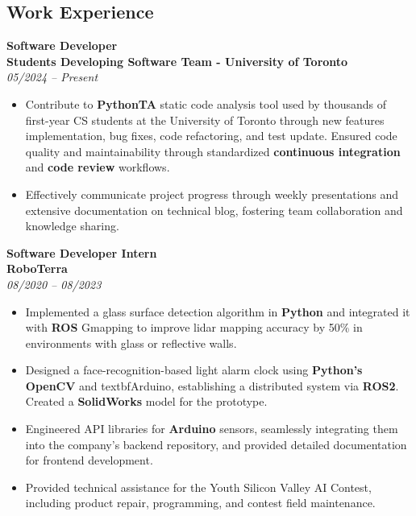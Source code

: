 \documentclass[a4paper,10pt]{article}
\begin{document}
\begin{multicols}{2}
\noindent
\section*{\color{NavyBlue}Work Experience}

\textbf{\large{Software Developer}} \\
\textbf{Students Developing Software Team - University of Toronto} \\
\textit{05/2024 -- Present} \\
\begin{itemize}
    \item Contribute to \textbf{PythonTA} static code analysis tool used by thousands of first-year CS students at the University of Toronto through new features implementation, bug fixes, code refactoring, and test update. Ensured code quality and maintainability through standardized \textbf{continuous integration} and \textbf{code review} workflows.
    \item Effectively communicate project progress through weekly presentations and extensive documentation on technical blog, fostering team collaboration and knowledge sharing.
\end{itemize}

\vspace{0.25cm}

\noindent
\textbf{\large{Software Developer Intern}}\\
\textbf{RoboTerra} \\
\textit{08/2020 -- 08/2023} \\
\begin{itemize}
    \item Implemented a glass surface detection algorithm in \textbf{Python} and integrated it with \textbf{ROS} Gmapping to improve lidar mapping accuracy by 50\% in environments with glass or reflective walls.
    \item Designed a face-recognition-based light alarm clock using \textbf{Python's OpenCV} and textbf{Arduino}, establishing a distributed system via \textbf{ROS2}. Created a \textbf{SolidWorks} model for the prototype.
    \item Engineered API libraries for \textbf{Arduino} sensors, seamlessly integrating them into the company's backend repository, and provided detailed documentation for frontend development.
    \item Provided technical assistance for the Youth Silicon Valley AI Contest, including product repair, programming, and contest field maintenance.
\end{itemize}


\end{multicols}
\end{document}
